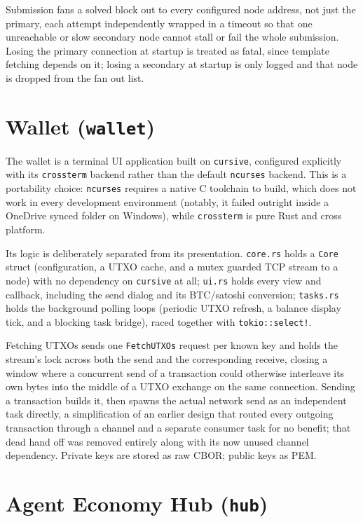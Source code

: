 \documentclass[11pt]{article}
\newcommand{\code}[1]{\texttt{#1}}
\begin{document}
Submission fans a solved block out to every configured node address, not just the primary, each attempt independently wrapped in a timeout so that one unreachable or slow secondary node cannot stall or fail the whole submission. Losing the primary connection at startup is treated as fatal, since template fetching depends on it; losing a secondary at startup is only logged and that node is dropped from the fan out list.

\section{Wallet (\code{wallet})}

The wallet is a terminal UI application built on \code{cursive}, configured explicitly with its \code{crossterm} backend rather than the default \code{ncurses} backend. This is a portability choice: \code{ncurses} requires a native C toolchain to build, which does not work in every development environment (notably, it failed outright inside a OneDrive synced folder on Windows), while \code{crossterm} is pure Rust and cross platform.

Its logic is deliberately separated from its presentation. \code{core.rs} holds a \code{Core} struct (configuration, a UTXO cache, and a mutex guarded TCP stream to a node) with no dependency on \code{cursive} at all; \code{ui.rs} holds every view and callback, including the send dialog and its BTC/satoshi conversion; \code{tasks.rs} holds the background polling loops (periodic UTXO refresh, a balance display tick, and a blocking task bridge), raced together with \code{tokio::select!}.

Fetching UTXOs sends one \code{FetchUTXOs} request per known key and holds the stream's lock across both the send and the corresponding receive, closing a window where a concurrent send of a transaction could otherwise interleave its own bytes into the middle of a UTXO exchange on the same connection. Sending a transaction builds it, then spawns the actual network send as an independent task directly, a simplification of an earlier design that routed every outgoing transaction through a channel and a separate consumer task for no benefit; that dead hand off was removed entirely along with its now unused channel dependency. Private keys are stored as raw CBOR; public keys as PEM.

\section{Agent Economy Hub (\code{hub})}
\label{sec:hub}
\end{document}
